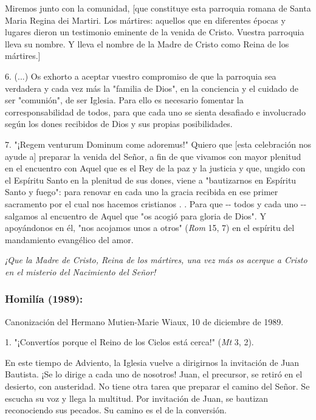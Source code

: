 \begin{body}
\begin{body}
Miremos junto con la comunidad, {[}que constituye esta parroquia romana de Santa Maria Regina dei Martiri. Los mártires: aquellos que en diferentes épocas y lugares dieron un testimonio eminente de la venida de Cristo. Vuestra parroquia lleva su nombre. Y lleva el nombre de la Madre de Cristo como Reina de los mártires.{]}

6. (...) Os exhorto a aceptar vuestro compromiso de que la parroquia sea verdadera y cada vez más la "familia de Dios", en la conciencia y el cuidado de ser "comunión", de ser Iglesia. Para ello es necesario fomentar la corresponsabilidad de todos, para que cada uno se sienta desafiado e involucrado según los dones recibidos de Dios y sus propias posibilidades.

7. "¡Regem venturum Dominum come adoremus!" Quiero que {[}esta celebración nos ayude a{]} preparar la venida del Señor, a fin de que vivamos con mayor plenitud en el encuentro con Aquel que es el Rey de la paz y la justicia y que, ungido con el Espíritu Santo en la plenitud de sus dones, viene a "bautizarnos en Espíritu Santo y fuego": para renovar en cada uno la gracia recibida en ese primer sacramento por el cual nos hacemos cristianos . . Para que -\/- todos y cada uno -\/- salgamos al encuentro de Aquel que "os acogió para gloria de Dios". Y apoyándonos en él, "nos acojamos unos a otros" (\emph{Rom} 15, 7) en el espíritu del mandamiento evangélico del amor.

\emph{¡Que la Madre de Cristo, Reina de los mártires, una vez más os acerque a Cristo en el misterio del Nacimiento del Señor!}
\end{body} 
	
\subsubsection{Homilía (1989): }

Canonización del Hermano Mutien-Marie Wiaux, 10 de diciembre de 1989.

\begin{body} 
1. "¡Convertíos porque el Reino de los Cielos está cerca!" (\emph{Mt} 3, 2).

En este tiempo de Adviento, la Iglesia vuelve a dirigirnos la invitación de Juan Bautista. ¡Se lo dirige a cada uno de nosotros! Juan, el precursor, se retiró en el desierto, con austeridad. No tiene otra tarea que preparar el camino del Señor. Se escucha su voz y llega la multitud. Por invitación de Juan, se bautizan reconociendo sus pecados. Su camino es el de la conversión.


\end{body}
\end{body}
